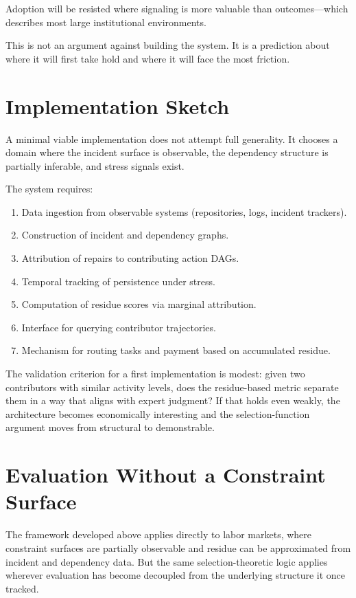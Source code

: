 \documentclass[12pt]{article}
\begin{document}
Adoption will be resisted where signaling is more valuable than
outcomes---which describes most large institutional environments.

This is not an argument against building the system. It is a prediction
about where it will first take hold and where it will face the most
friction.

\section{Implementation Sketch}

A minimal viable implementation does not attempt full generality. It
chooses a domain where the incident surface is observable, the
dependency structure is partially inferable, and stress signals exist.

The system requires:
\begin{enumerate}
  \item Data ingestion from observable systems (repositories, logs,
    incident trackers).
  \item Construction of incident and dependency graphs.
  \item Attribution of repairs to contributing action DAGs.
  \item Temporal tracking of persistence under stress.
  \item Computation of residue scores via marginal attribution.
  \item Interface for querying contributor trajectories.
  \item Mechanism for routing tasks and payment based on accumulated
    residue.
\end{enumerate}

The validation criterion for a first implementation is modest: given
two contributors with similar activity levels, does the residue-based
metric separate them in a way that aligns with expert judgment? If that
holds even weakly, the architecture becomes economically interesting and
the selection-function argument moves from structural to demonstrable.

\section{Evaluation Without a Constraint Surface}

The framework developed above applies directly to labor markets, where
constraint surfaces are partially observable and residue can be
approximated from incident and dependency data. But the same
selection-theoretic logic applies wherever evaluation has become
decoupled from the underlying structure it once tracked.
\end{document}
